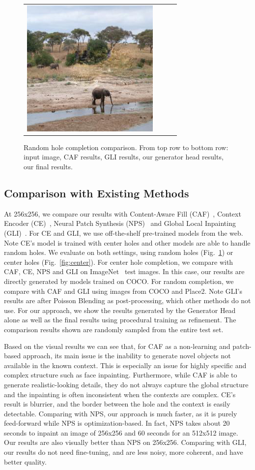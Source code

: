 \begin{figure}[H]
\begin{tabular}{cccc}
\includegraphics[width=.24\textwidth]{figures/random/000000286994.png} \\
\end{tabular}
\caption{Random hole completion comparison. From top row to bottom row: input image, CAF results, GLI results, our generator head results, our final results.}
\label{fig:random}
\vspace{-10pt}
\end{figure}

\subsection{Comparison with Existing Methods}
\label{exp:comparison}
At 256x256, we compare our results with Content-Aware Fill (CAF)~\cite{barnes2009patchmatch}, Context Encoder (CE)~\cite{pathak2016context}, Neural Patch Synthesis (NPS)~\cite{yang2017high} and Global Local Inpainting (GLI)~\cite{iizuka2017globally}. For CE and GLI, we use off-the-shelf pre-trained models from the web. Note CE's model is trained with center holes and other models are able to handle random holes. We evaluate on both settings, using random holes (Fig.~\ref{fig:random}) or center holes (Fig.~\ref{fig:center}). For center hole completion, we compare with CAF, CE, NPS and GLI on ImageNet~\cite{russakovsky2015imagenet} test images. In this case, our results are directly generated by models trained on COCO. For random completion, we compare with CAF and GLI using images from COCO and Place2. Note GLI's results are after Poisson Blending as post-processing, which other methods do not use. For our approach, we show the results generated by the Generator Head alone as well as the final results using procedural training as refinement. The comparison results shown are randomly sampled from the entire test set. 

Based on the visual results we can see that, for CAF as a non-learning and patch-based approach, its main issue is the inability to generate novel objects not available in the known context. This is especially an issue for highly specific and complex structure such as face inpainting. Furthermore, while CAF is able to generate realistic-looking details, they do not always capture the global structure and the inpainting is often inconsistent when the contexts are complex. CE's result is blurrier, and the border between the hole and the context is easily detectable. Comparing with NPS, our approach is much faster, as it is purely feed-forward while NPS is optimization-based. In fact, NPS takes about 20 seconds to inpaint an image of 256x256 and 60 seconds for an 512x512 image. Our results are also visually better than NPS on 256x256. Comparing with GLI, our results do not need fine-tuning, and are less noisy, more coherent, and have better quality. 

